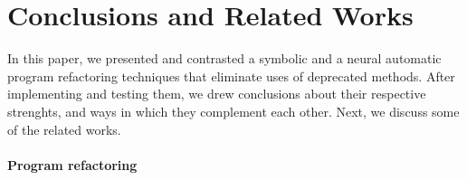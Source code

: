 \documentclass[sigconf,review,anonymous]{acmart}
\begin{document}



\section{Conclusions and Related Works}

In this paper, we presented and contrasted a symbolic and a neural automatic program refactoring
techniques that eliminate uses of deprecated methods. After implementing and testing them, we drew
conclusions about their respective strenghts, and ways in which they complement each other.
Next, we discuss some of the related works.

\paragraph{Program refactoring}
\end{document}
